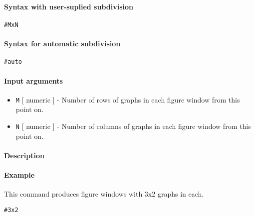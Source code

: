 


	\paragraph{Syntax with user-suplied
subdivision}

\begin{verbatim}
#MxN
\end{verbatim}

\paragraph{Syntax for automatic
subdivision}

\begin{verbatim}
#auto
\end{verbatim}

\paragraph{Input arguments}

\begin{itemize}
\item
  \texttt{M} {[} numeric {]} - Number of rows of graphs in each figure
  window from this point on.
\item
  \texttt{N} {[} numeric {]} - Number of columns of graphs in each
  figure window from this point on.
\end{itemize}

\paragraph{Description}

\paragraph{Example}

This command produces figure windows with 3x2 graphs in each.

\begin{verbatim}
#3x2
\end{verbatim}


